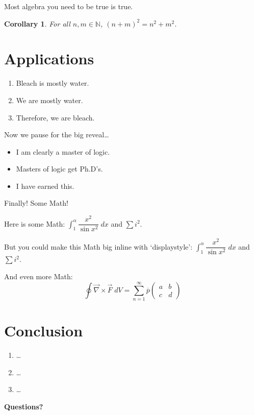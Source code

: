 \documentclass{beamer}	%
\newcommand{\N}{\mathbb{N}}
\newcommand{\ds}{\displaystyle}
\newcommand{\ov}[1]{\overline{#1}}
\newcommand{\twomatrix}[4]{\begin{pmatrix} #1 & #2 \\ #3 & #4 \end{pmatrix}}
\theoremstyle{plain}
\newtheorem{cor}{Corollary}[section]
\theoremstyle{definition}
\theoremstyle{remark}
\numberwithin{equation}{section}
\begin{document}
\begin{frame}
Most algebra you need to be true is true.
\begin{cor}
For all $n,m \in \N$, $(n+m)^2= n^2 + m^2$.
\end{cor}
\end{frame}



\section{Applications}



\begin{frame}
	\begin{enumerate}[1.]
	\item Bleach is mostly water. \pause
	\item We are mostly water. \pause
	\item Therefore, we are bleach.
	\end{enumerate} \vspace{0.5cm}

Now we pause for the big reveal\dots \pause \vspace{0.3cm}

	\begin{itemize}
	\item I am clearly a master of logic.
	\item Masters of logic get Ph.D's.
	\item I have earned this.
	\end{itemize}
\end{frame}



\begin{frame}
Finally! Some Math! \vspace{1cm}

Here is some Math: $\int_1^\alpha \dfrac{x^2}{\sin x^2} \;dx$ and $\sum i^2$. \vspace{1cm}

But you could make this Math big inline with `displaystyle': $\ds \int_1^\alpha \dfrac{x^2}{\sin x^2} \;dx$ and $\ds \sum i^2$. \vspace{1cm}

And even more Math:
	\[
	\oint \vec{\nabla} \times \vec{F} \;dV = \sum_{n=1}^\infty \ov{p} \twomatrix{a}{b}{c}{d}
	\]
\end{frame}



\section{Conclusion}



\begin{frame}
	\begin{enumerate}[1]
	\item \dots 
	\item \dots 
	\item \dots
	\end{enumerate} \vspace{0.5cm}
\end{frame}



\begin{frame}
\begin{center} {\bfseries \Large Questions?} \end{center}
\end{frame}
\end{document}
